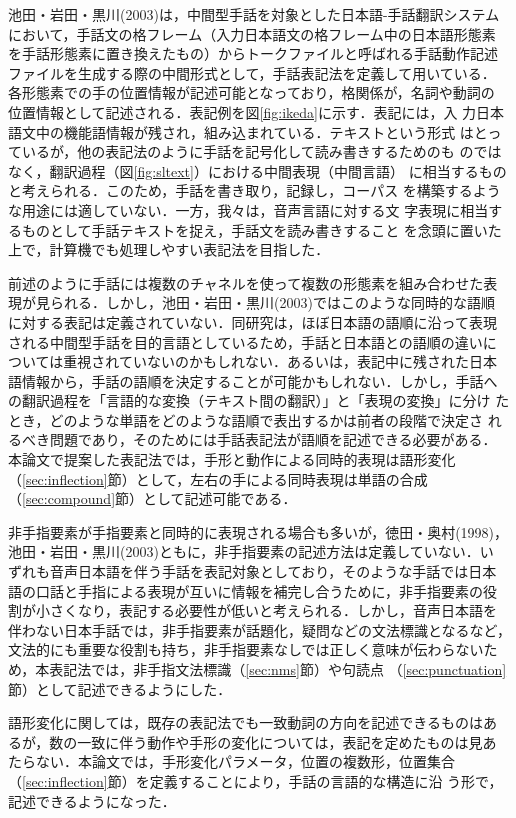 池田・岩田・黒川(2003)は，中間型手話を対象とした日本語-手話翻訳システム
において，手話文の格フレーム（入力日本語文の格フレーム中の日本語形態素
を手話形態素に置き換えたもの）からトークファイルと呼ばれる手話動作記述
ファイルを生成する際の中間形式として，手話表記法を定義して用いている．
各形態素での手の位置情報が記述可能となっており，格関係が，名詞や動詞の
位置情報として記述される．表記例を図\ref{fig:ikeda}に示す．表記には，入
力日本語文中の機能語情報が残され，組み込まれている．テキストという形式
はとっているが，他の表記法のように手話を記号化して読み書きするためのも
のではなく，翻訳過程（図\ref{fig:sltext}）における中間表現（中間言語）
に相当するものと考えられる．このため，手話を書き取り，記録し，コーパス
を構築するような用途には適していない．一方，我々は，音声言語に対する文
字表現に相当するものとして手話テキストを捉え，手話文を読み書きすること
を念頭に置いた上で，計算機でも処理しやすい表記法を目指した．

前述のように手話には複数のチャネルを使って複数の形態素を組み合わせた表
現が見られる．しかし，池田・岩田・黒川(2003)ではこのような同時的な語順
に対する表記は定義されていない．同研究は，ほぼ日本語の語順に沿って表現
される中間型手話を目的言語としているため，手話と日本語との語順の違いに
ついては重視されていないのかもしれない．あるいは，表記中に残された日本
語情報から，手話の語順を決定することが可能かもしれない．しかし，手話へ
の翻訳過程を「言語的な変換（テキスト間の翻訳）」と「表現の変換」に分け
たとき，どのような単語をどのような語順で表出するかは前者の段階で決定さ
れるべき問題であり，そのためには手話表記法が語順を記述できる必要がある．
本論文で提案した表記法では，手形と動作による同時的表現は語形変化
（\ref{sec:inflection}節）として，左右の手による同時表現は単語の合成
（\ref{sec:compound}節）として記述可能である．

非手指要素が手指要素と同時的に表現される場合も多いが，徳田・奥村(1998)，
池田・岩田・黒川(2003)ともに，非手指要素の記述方法は定義していない．い
ずれも音声日本語を伴う手話を表記対象としており，そのような手話では日本
語の口話と手指による表現が互いに情報を補完し合うために，非手指要素の役
割が小さくなり，表記する必要性が低いと考えられる．しかし，音声日本語を
伴わない日本手話では，非手指要素が話題化，疑問などの文法標識となるなど，
文法的にも重要な役割も持ち，非手指要素なしでは正しく意味が伝わらないた
め，本表記法では，非手指文法標識（\ref{sec:nms}節）や句読点
（\ref{sec:punctuation}節）として記述できるようにした．

語形変化に関しては，既存の表記法でも一致動詞の方向を記述できるものはあ
るが，数の一致に伴う動作や手形の変化については，表記を定めたものは見あ
たらない．本論文では，手形変化パラメータ，位置の複数形，位置集合
（\ref{sec:inflection}節）を定義することにより，手話の言語的な構造に沿
う形で，記述できるようになった．

